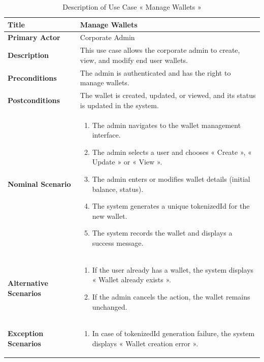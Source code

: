 \begin{longtable}{|p{4cm}|p{10cm}|}
      \caption{Description of Use Case « Manage Wallets »}
  \label{tab:uc_manage_wallets} \\
  \hline
  \textbf{Title} & Manage Wallets \\ \hline
  \textbf{Primary Actor} & Corporate Admin \\ \hline
  \textbf{Description} & This use case allows the corporate admin to create, view, and modify end user wallets. \\ \hline
  \textbf{Preconditions} & The admin is authenticated and has the right to manage wallets. \\ \hline
\textbf{Postconditions} & The wallet is created, updated, or viewed, and its status is updated in the system. \\ \hline
  \textbf{Nominal Scenario} &
    \begin{enumerate}[nosep,leftmargin=*]
      \item The admin navigates to the wallet management interface.
      \item The admin selects a user and chooses « Create », « Update » or « View ».
      \item The admin enters or modifies wallet details (initial balance, status).
      \item The system generates a unique tokenizedId for the new wallet.
      \item The system records the wallet and displays a success message.
    \end{enumerate} \\ \hline
  \textbf{Alternative Scenarios} &
    \begin{enumerate}[nosep,leftmargin=*]
      \item If the user already has a wallet, the system displays « Wallet already exists ».
      \item If the admin cancels the action, the wallet remains unchanged.
    \end{enumerate} \\ \hline
  \textbf{Exception Scenarios} &
    \begin{enumerate}[nosep,leftmargin=*]
      \item In case of tokenizedId generation failure, the system displays « Wallet creation error ».
    \end{enumerate} \\ \hline
\end{longtable}

